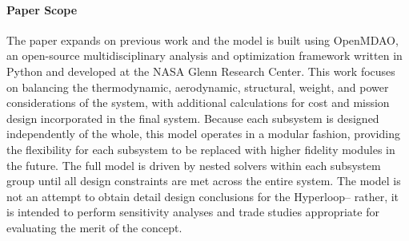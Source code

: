 \paragraph{Paper Scope}

    The paper expands on previous work \cite{Chin} and the model is built
    using OpenMDAO, an open-source multidisciplinary analysis and optimization
    framework written in Python and developed at the NASA Glenn Research Center.
    This work focuses on balancing the thermodynamic, aerodynamic, structural,
    weight, and power considerations of the system, with additional calculations for cost
    and mission design incorporated in the final system. Because each subsystem
    is designed independently of the whole, this model operates in a modular fashion,
    providing the flexibility for each subsystem to be replaced with higher
    fidelity modules in the future. The full model is driven by nested solvers
    within each subsystem group until all design constraints are met across the
    entire system.
    The model is not an attempt to obtain detail design conclusions for the
    Hyperloop-- rather, it is intended to perform sensitivity analyses
    and trade studies appropriate for evaluating the merit of the concept.

